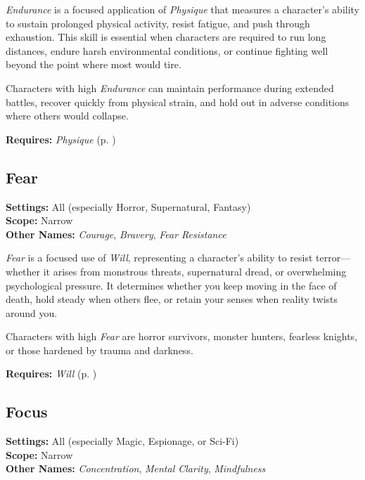 \emph{Endurance} is a focused application of \emph{Physique} that measures a character's ability to sustain prolonged physical activity, resist fatigue, and push through exhaustion. This skill is essential when characters are required to run long distances, endure harsh environmental conditions, or continue fighting well beyond the point where most would tire.

Characters with high \emph{Endurance} can maintain performance during extended battles, recover quickly from physical strain, and hold out in adverse conditions where others would collapse.

\vspace{0.5\baselineskip}
\noindent\textbf{Requires:} \emph{Physique} (p. \pageref{skill:physique})



\subsection{Fear}\label{skill:fear}
\textbf{Settings:} All (especially Horror, Supernatural, Fantasy)\\
\textbf{Scope:} Narrow\\
\textbf{Other Names:} \emph{Courage}, \emph{Bravery}, \emph{Fear Resistance}\\
\vspace{\baselineskip}

\emph{Fear} is a focused use of \emph{Will}, representing a character’s ability to resist terror—whether it arises from monstrous threats, supernatural dread, or overwhelming psychological pressure. It determines whether you keep moving in the face of death, hold steady when others flee, or retain your senses when reality twists around you.

Characters with high \emph{Fear} are horror survivors, monster hunters, fearless knights, or those hardened by trauma and darkness.

\vspace{0.5\baselineskip}
\noindent\textbf{Requires:} \emph{Will} (p. \pageref{skill:will})




\subsection{Focus}\label{skill:focus}
\textbf{Settings:} All (especially Magic, Espionage, or Sci-Fi)\\
\textbf{Scope:} Narrow\\
\textbf{Other Names:} \emph{Concentration}, \emph{Mental Clarity}, \emph{Mindfulness}\\
\vspace{\baselineskip}

